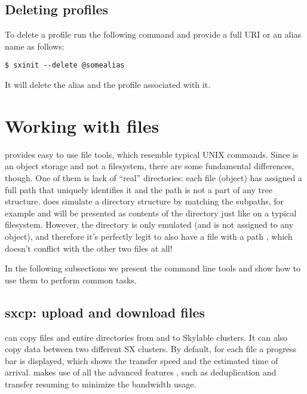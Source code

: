 \subsection{Deleting profiles}
To delete a profile run the following command and provide a full URI
or an alias name as follows:
\begin{lstlisting}
$ sxinit --delete @somealias
\end{lstlisting}
It will delete the alias  and the profile associated with
it.

\section{Working with files} \label{sec:files}
\SX provides easy to use file tools, which resemble typical UNIX commands.
Since \SX is an object storage and not a filesystem, there are some
fundamental differences, though. One of them is lack of ``real'' directories:
each file (object) has assigned a full path that uniquely identifies it and
the path is not a part of any tree structure. \SX does simulate a directory
structure by matching the subpaths, for example 
and  will be presented as contents of the directory
 just like on a typical filesystem. However, the directory
 is only emulated (and is not assigned to any object), and
therefore it's perfectly legit to also have a file with a path ,
which doesn't conflict with the other two files at all! 

In the following subsections we present the command line tools and show
how to use them to perform common tasks.

\subsection{sxcp: upload and download files}
 can copy files and entire directories from and to Skylable \SX
clusters. It can also copy data between two different SX clusters. By default,
for each file a progress bar is displayed, which shows the transfer speed and
the estimated time of arrival.  makes use of all the advanced features \SX,
such as deduplication and transfer resuming to minimize the bandwidth usage.

